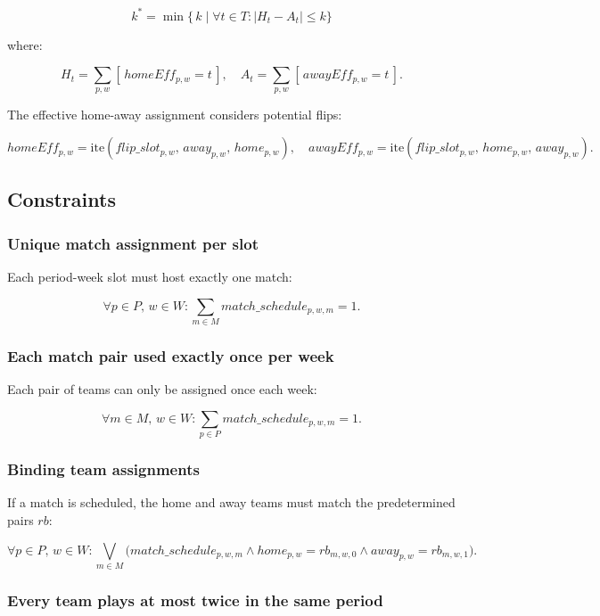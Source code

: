 \[
k^* = \min \big\{\, k \mid \forall t \in T : |H_t - A_t| \leq k \big\}
\]

where:

\[
H_t = \sum_{p,w} [\,homeEff_{p,w} = t\,], 
\quad 
A_t = \sum_{p,w} [\,awayEff_{p,w} = t\,].
\]

The effective home-away assignment considers potential flips:

\[
homeEff_{p,w} = \text{ite}(flip\_slot_{p,w},\, away_{p,w},\, home_{p,w}), 
\quad 
awayEff_{p,w} = \text{ite}(flip\_slot_{p,w},\, home_{p,w},\, away_{p,w}).
\]

\subsection{Constraints}

\subsubsection{Unique match assignment per slot}

Each period-week slot must host exactly one match:

\[
\forall p \in P,\, w \in W: 
\sum_{m \in M} match\_schedule_{p,w,m} = 1.
\]

\subsubsection{Each match pair used exactly once per week}

Each pair of teams can only be assigned once each week:

\[
\forall m \in M,\, w \in W: 
\sum_{p \in P} match\_schedule_{p,w,m} = 1.
\]

\subsubsection{Binding team assignments}

If a match is scheduled, the home and away teams must match the predetermined pairs $rb$:

\[
\forall p \in P,\, w \in W: 
\bigvee_{m \in M} \big(
match\_schedule_{p,w,m} \wedge home_{p,w} = rb_{m,w,0} \wedge away_{p,w} = rb_{m,w,1}
\big).
\]

\subsubsection{Every team plays at most twice in the same period}

